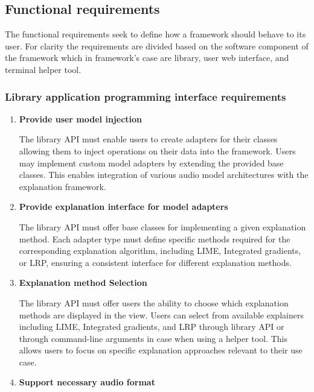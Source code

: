 \documentclass[
    bindingoffset=5mm,  %
    footnoteindent=3mm, %
    hyphenation=true    %
]{src/wut-thesis}
\begin{document}
\subsection{Functional requirements}

    The functional requirements seek to define how a framework should behave to its user.
    For clarity the requirements are divided based on the software component of the framework which
    in framework's case are library, user web interface, and terminal helper tool.

\subsubsection{Library application programming interface requirements}
    \begin{enumerate}[itemsep=1\baselineskip]

    \item \textbf{Provide user model injection}

        The library API must enable users to create adapters for their classes allowing them to inject operations on
    their data into the framework. Users may implement custom model adapters by extending the provided base
    classes. This enables integration of various audio model architectures with the explanation
    framework.

    \item \textbf{Provide explanation interface for model adapters}

        The library API must offer base classes for implementing a given explanation method.
    Each adapter type must define specific methods required for the corresponding explanation algorithm,
    including LIME, Integrated gradients, or LRP, ensuring a consistent interface for different explanation methods.

    \item \textbf{Explanation method Selection}

        The library API must offer users the ability to choose which explanation methods are displayed in the view.
    Users can select from available explainers including LIME, Integrated gradients, and LRP through library API or through
    command-line arguments in case when using a helper tool. This allows users to focus on specific explanation
    approaches relevant to their use case.

    \item \textbf{Support necessary audio format}


\end{enumerate}
\end{document}
